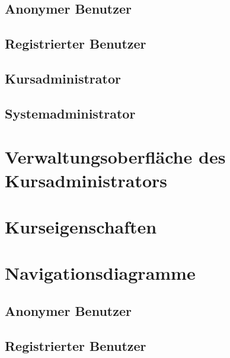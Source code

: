 \documentclass[a4paper]{scrreprt}
\begin{document}
    
    \subsection{Anonymer Benutzer}
       	
       	
       	
    \subsection{Registrierter Benutzer}
       
       	
       	    
    \subsection{Kursadministrator}
        
        

    \subsection{Systemadministrator}
        
        
            
   
    
    \section{Verwaltungsoberfläche des Kursadministrators}
    
   
       
    
    \section{Kurseigenschaften}
    
    
       
    
    
    \section{Navigationsdiagramme}
        \subsection{Anonymer Benutzer}
            
            
            
        \subsection{Registrierter Benutzer}
             
\end{document}
